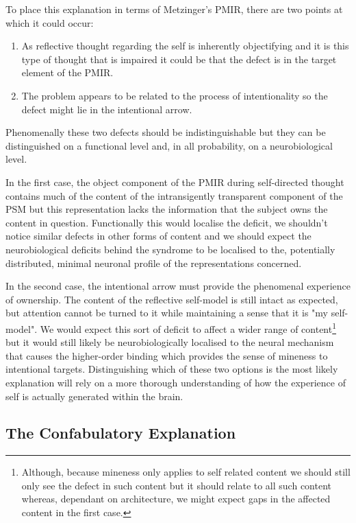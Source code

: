 To place this explanation in terms of Metzinger's PMIR, there are two points at which it could occur:
\begin{enumerate}
    \item As reflective thought regarding the self is inherently objectifying and it is this type of thought that is impaired it could be that the defect is in the target element of the PMIR.
    \item The problem appears to be related to the process of intentionality so the defect might lie in the intentional arrow.
\end{enumerate}
Phenomenally these two defects should be indistinguishable but they can be distinguished on a functional level and, in all probability, on a neurobiological level.

In the first case, the object component of the PMIR during self-directed thought contains much of the content of the intransigently transparent component of the PSM but this representation lacks the information that the subject owns the content in question. Functionally this would localise the deficit, we shouldn't notice similar defects in other forms of content and we should expect the neurobiological deficits behind the syndrome to be localised to the, potentially distributed, minimal neuronal profile of the representations concerned.

In the second case, the intentional arrow must provide the phenomenal experience of ownership. The content of the reflective self-model is still intact as expected, but attention cannot be turned to it while maintaining a sense that it is "my self-model". We would expect this sort of deficit to affect a wider range of content\footnote{Although, because mineness only applies to self related content we should still only see the defect in such content but it should relate to all such content whereas, dependant on architecture, we might expect gaps in the affected content in the first case.} but it would still likely be neurobiologically localised to the neural mechanism that causes the higher-order binding which provides the sense of mineness to intentional targets.
Distinguishing which of these two options is the most likely explanation will rely on a more thorough understanding of how the experience of self is actually generated within the brain.

\subsection{The Confabulatory Explanation}
\label{psych_alternatives_confab}

